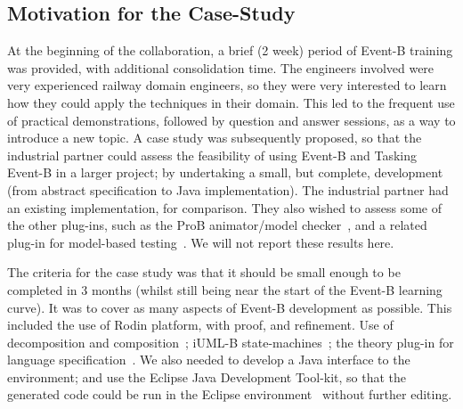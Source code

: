 \documentclass{llncs}%
\begin{document}
\subsection{Motivation for the Case-Study}
At the beginning of the collaboration, a brief (2 week) period of Event-B training was provided, with additional consolidation time. The engineers involved were very experienced railway domain engineers, so they were very interested to learn how they could apply the techniques in their domain. This led to the frequent use of practical demonstrations, followed by question and answer sessions, as a way to introduce a new topic.  A case study was subsequently proposed, so that the industrial partner could assess the feasibility of using Event-B and Tasking Event-B in a larger project; by undertaking a small, but complete, development (from abstract specification to Java implementation). The industrial partner had an existing implementation, for comparison. They also wished to assess some of the other plug-ins, such as the ProB animator/model checker~\cite{ProB}, and a related plug-in for model-based testing~\cite{DBLP:conf/asm/DincaIMS12}. We will not report these results here. 

The criteria for the case study was that it should be small enough to be completed in 3 months (whilst still being near the start of the Event-B learning curve). It was to cover as many aspects of Event-B development as possible. This included the use of Rodin platform, with proof, and refinement. Use of decomposition and composition~\cite{decomp2010c}; iUML-B state-machines~\cite{snookIUMLB}; the theory plug-in for language specification~\cite{ecs18269}. We also needed to develop a Java interface to the environment; and use the Eclipse Java Development Tool-kit, so that the generated code could be run in the Eclipse environment~\cite{EclipseOrg} without further editing. 
%
%
\end{document}
